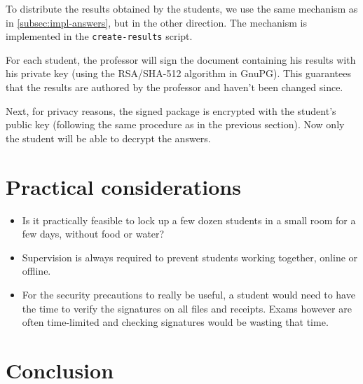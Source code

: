 \documentclass[12pt]{article}
\begin{document}
To distribute the results obtained by the students, we use the same mechanism as
in \autoref{subsec:impl-answers}, but in the other direction. The mechanism is
implemented in the \texttt{create-results} script.


For each student, the professor will sign the document containing his results
with his private key (using the RSA/SHA-512 algorithm in GnuPG). This guarantees
that the results are authored by the professor and haven't been changed since.

Next, for privacy reasons, the signed package is encrypted with the student's
public key (following the same procedure as in the previous section). Now only
the student will be able to decrypt the answers.



\section{Practical considerations}
\label{sec:practical}

\begin{itemize}


\item Is it practically feasible to lock up a few dozen students in a small room
for a few days, without food or water?

\item Supervision is always required to prevent students working together,
online or offline.

\item For the security precautions to really be useful, a student would need to
  have the time to verify the signatures on all files and receipts. Exams
  however are often time-limited and checking signatures would be wasting that
  time.

\end{itemize}

\section{Conclusion}
\label{sec:conclusion}

\end{document}
